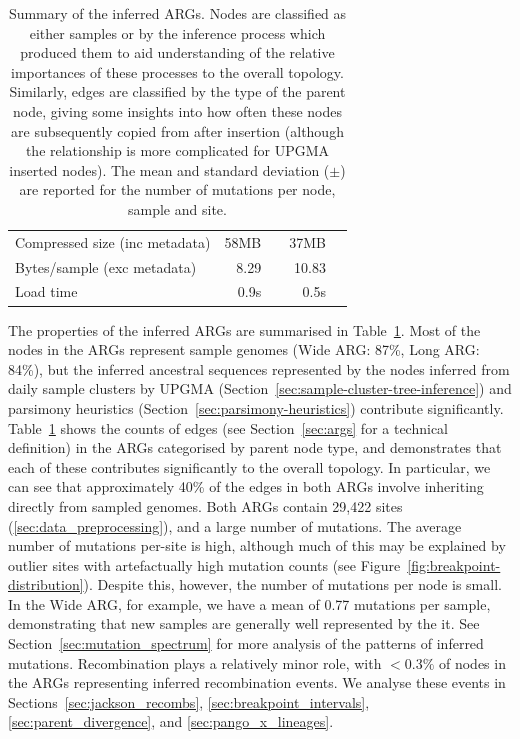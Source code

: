 \documentclass{article}
\begin{document}
\begin{table}
\begin{center}
\begin{tabular}{llrlrl}
    \cmidrule{2-6}
    \multicolumn{2}{l}{Compressed size (inc metadata)} & 58MB & & 37MB&  \\
    \multicolumn{2}{l}{Bytes/sample (exc metadata)}  & 8.29  & & 10.83 \\
    Load time & & 0.9s & & 0.5s & \\
    \bottomrule
\end{tabular}
\end{center}
\caption{\label{tab:args}Summary of the inferred ARGs. Nodes are classified
as either samples or by the inference process which produced them to aid
understanding of the relative importances of these processes to the overall
topology. Similarly, edges are classified by the type of the parent node,
giving some insights into how often these nodes are subsequently
copied from after insertion (although the relationship is more complicated
for UPGMA inserted nodes). The mean and standard deviation ($\pm$)
are reported for the number of mutations per node, sample and site.
}
\end{table}

The properties of the inferred ARGs are summarised in Table~\ref{tab:args}.
Most of the nodes in the ARGs represent sample genomes
(Wide ARG: 87\%, Long ARG: 84\%), but the inferred ancestral sequences
represented by the nodes inferred from daily sample clusters
by UPGMA (Section~\ref{sec:sample-cluster-tree-inference})
and parsimony heuristics (Section~\ref{sec:parsimony-heuristics})
contribute significantly.
Table~\ref{tab:args} shows the counts of edges (see
Section~\ref{sec:args} for a technical definition) in the ARGs
categorised by parent node type, and demonstrates that each
of these contributes significantly to the overall topology.
In particular, we can see that approximately 40\% of the edges
in both ARGs involve inheriting directly from sampled genomes.
Both ARGs contain 29,422 sites (\ref{sec:data_preprocessing}),
and a large number of mutations.
The average number of mutations per-site is high, although much
of this may be explained by outlier sites with artefactually high
mutation counts (see Figure~\ref{fig:breakpoint-distribution}).
Despite this, however, the number of mutations per node
is small. In the Wide ARG, for example, we have a mean of 0.77
mutations per sample, demonstrating that new samples are generally
well represented by the it. See Section~\ref{sec:mutation_spectrum}
for more analysis of the patterns of inferred mutations.
Recombination plays a relatively minor role, with $<0.3\%$
of nodes in the ARGs representing inferred recombination events.
We analyse these events in Sections~\ref{sec:jackson_recombs},
\ref{sec:breakpoint_intervals}, \ref{sec:parent_divergence},
and \ref{sec:pango_x_lineages}.
\end{document}
